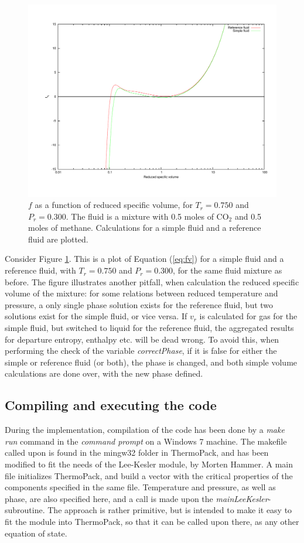 \documentclass[english]{../thermomemo/thermomemo}
\numberwithin{equation}{section}
\newcommand*{\reff}[1]{(\ref{#1})}
\begin{document}
\begin{figure}
	\centering
	\includegraphics[trim = 1.5cm 2cm 0 1cm, clip = true, width=14cm]{075Tc_SR}
	\caption{$f$ as a function of reduced specific volume, for $T_r = 0.750$ and $P_r = 0.300$. The fluid is a mixture with 0.5 moles of CO$_2$ and 0.5 moles of methane. Calculations for a simple fluid and a reference fluid are plotted.}
	\label{fig:vrSimpRef}
\end{figure}

Consider Figure \ref{fig:vrSimpRef}. This is a plot of Equation \reff{eq:fv} for a simple fluid and a reference fluid, with $T_r = 0.750$ and $P_r = 0.300$, for the same fluid mixture as before. The figure illustrates another pitfall, when calculation the reduced specific volume of the mixture: for some relations between reduced temperature and pressure, a only single phase solution exists for the reference fluid, but two solutions exist for the simple fluid, or vice versa. If $v_r$ is calculated for gas for the simple fluid, but switched to liquid for the reference fluid, the aggregated results for departure entropy, enthalpy etc. will be dead wrong. To avoid this, when performing the check of the variable \textit{correctPhase}, if it is false for either the simple or reference fluid (or both), the phase is changed, and both simple volume calculations are done over, with the new phase defined.

\subsection{Compiling and executing the code}
During the implementation, compilation of the code has been done by a \textit{make run} command in the \textit{command prompt} on a Windows 7 machine. The makefile called upon is found in the mingw32 folder in ThermoPack, and has been modified to fit the needs of the Lee-Kesler module, by Morten Hammer. A main file initializes ThermoPack, and build a vector with the critical properties of the components specified in the same file. Temperature and pressure, as well as phase, are also specified here, and a call is made upon the \textit{mainLeeKesler}-subroutine. The approach is rather primitive, but is intended to make it easy to fit the module into ThermoPack, so that it can be called upon there, as any other equation of state. 
\end{document}

